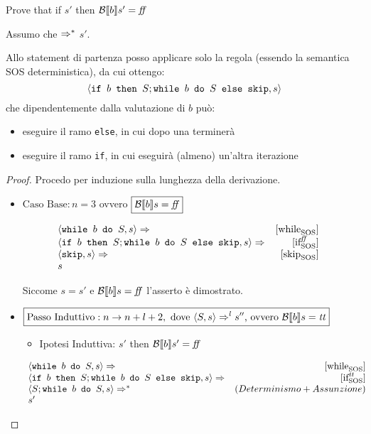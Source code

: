          {
           Prove that if  \Rar{*} $s'$ then $\B{b}' = \semfalse$
         }
         {
           Assumo che  $\Rar{*}$ $s'$.

            Allo statement di partenza posso applicare solo la regola \whileSOS 
            (essendo la semantica SOS deterministica), da cui ottengo:  
           $$
            \confSs{\ifABC{b}{S; \wbS{b}{S}}{\skipForFriends}}{s} 
           $$
            che dipendentemente dalla valutazione di $b$ può: 
            \begin{itemize}
               \item eseguire il ramo \texttt{else}, in cui dopo una 
               \skipForFriends{} terminerà 
               \item eseguire il ramo \texttt{if}, in cui eseguirà (almeno) 
               un'altra iterazione
            \end{itemize}
           \begin{proof}
                        Procedo per induzione sulla lunghezza della derivazione.

           \begin{itemize}
             \item $\boxed{\text{Caso Base}: n = 3}$ ovvero 
           $\boxed{\B{b} = \semfalse}$ 

          $$
          \begin{array}{lrr}
    \confSs{\wbS{b}{S}}{s} \Rar{} & \whileSOS & \\
    \confSs{\ifABC{b}{S; \wbS{b}{S}}{\skipForFriends}}{s} \Rar{} & \ifffSOS & \\
    \confSs{\skipForFriends}{s} \Rar{} & \skipSOS & \\
    s & & \\
          \end{array}
          $$

           Siccome $s = s'$ e $\B{b} = \semfalse$ l'asserto è dimostrato.

           \item $\boxed{\text{Passo Induttivo}: n \rightarrow n + l + 2,
             \text{ dove } \confSs{S}{s} \Rar{l} s'' \text{, ovvero } \B{b} = \semtrue}$
             \begin{itemize}
               \item Ipotesi Induttiva:   $s'$ then $\B{b}' = \semfalse$
             \end{itemize}
          $$
          \begin{array}{lrr}
    \confSs{\wbS{b}{S}}{s} \Rar{} & \whileSOS & \\
    \confSs{\ifABC{b}{S; \wbS{b}{S}}{\skipForFriends}}{s} \Rar{} & \ifttSOS & \\
    \confSs{S; \wbS{b}{S}}{s} \Rar{*} & (Determinismo + Assunzione) & \\
    s' & & \\
          \end{array}
          $$


\end{itemize}
\end{proof}}
